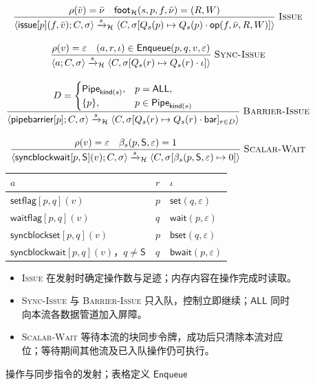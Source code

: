 \documentclass[UTF8,a4paper,11pt,fontset=fandol]{ctexart}
\newcommand{\kw}[1]{\ensuremath{\mathsf{#1}}}
\newcommand{\infer}[2]{\displaystyle\frac{\displaystyle #1}{\displaystyle #2}}
\begin{document}
\clearpage
\begin{figure}[!htbp]
\centering\small
\[
\begin{gathered}
\infer{\rho(\bar v)=\bar\nu\quad\mathsf{foot}_{\mathcal H}(s,p,f,\bar\nu)=(R,W)}
 {\langle\kw{issue}[p](f,\bar v);C,\sigma\rangle\xrightarrow{s}_{\mathcal H}
 \langle C,\sigma[Q_s(p)\mapsto Q_s(p)\cdot\kw{op}(f,\bar\nu,R,W)]\rangle}
 \;\textsc{Issue}\\[1em]
\infer{\rho(v)=\varepsilon\quad(a,r,\iota)\in\mathsf{Enqueue}(p,q,v,\varepsilon)}
 {\langle a;C,\sigma\rangle\xrightarrow{s}_{\mathcal H}
 \langle C,\sigma[Q_s(r)\mapsto Q_s(r)\cdot\iota]\rangle}
 \;\textsc{Sync-Issue}\\[1em]
\infer{D=\begin{cases}\mathsf{Pipe}_{\mathsf{kind}(s)},&p=\mathsf{ALL},\\\{p\},&p\in\mathsf{Pipe}_{\mathsf{kind}(s)}\end{cases}}
 {\langle\kw{pipebarrier}[p];C,\sigma\rangle\xrightarrow{s}_{\mathcal H}
 \langle C,\sigma[Q_s(r)\mapsto Q_s(r)\cdot\kw{bar}]_{r\in D}\rangle}
 \;\textsc{Barrier-Issue}\\[1em]
\infer{\rho(v)=\varepsilon\quad\beta_s(p,\mathsf S,\varepsilon)=1}
 {\langle\kw{syncblockwait}[p,\mathsf S](v);C,\sigma\rangle\xrightarrow{s}_{\mathcal H}
 \langle C,\sigma[\beta_s(p,\mathsf S,\varepsilon)\mapsto0]\rangle}
 \;\textsc{Scalar-Wait}
\end{gathered}
\]
\medskip
\begin{tabular}{@{}lll@{}}
\toprule
$a$ & $r$ & $\iota$\\
\midrule
$\kw{setflag}[p,q](v)$ & $p$ & $\kw{set}(q,\varepsilon)$\\
$\kw{waitflag}[p,q](v)$ & $q$ & $\kw{wait}(p,\varepsilon)$\\
$\kw{syncblockset}[p,q](v)$ & $p$ & $\kw{bset}(q,\varepsilon)$\\
$\kw{syncblockwait}[p,q](v)$，$q\ne\mathsf S$ & $q$ & $\kw{bwait}(p,\varepsilon)$\\
\bottomrule
\end{tabular}
\caption{操作与同步指令的发射；表格定义 $\mathsf{Enqueue}$}
\begin{itemize}
\item \textsc{Issue} 在发射时确定操作数与足迹；内存内容在操作完成时读取。
\item \textsc{Sync-Issue} 与 \textsc{Barrier-Issue} 只入队，控制立即继续；$\mathsf{ALL}$ 同时向本流各数据管道加入屏障。
\item \textsc{Scalar-Wait} 等待本流的块同步令牌，成功后只清除本流对应位；等待期间其他流及已入队操作仍可执行。
\end{itemize}
\end{figure}
\end{document}
